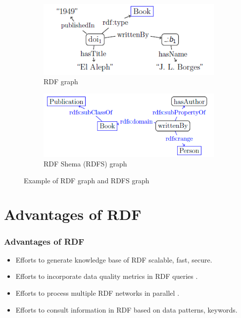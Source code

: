 \documentclass{beamer}
\numberwithin{figure}{section}
\numberwithin{equation}{section}
\begin{document}
\begin{frame}
 	\begin{figure}[h]
        \begin{subfigure}[h]{0.45\linewidth} 
            \includegraphics[width=\linewidth]{pictures/rdf_graph}
            \caption{\tiny RDF graph}
            \label{fig:rdf_graph}
        \end{subfigure}       
        \begin{subfigure}[h]{0.45\linewidth} 
            \includegraphics[width=\linewidth]{pictures/rdfs_graph}
            \caption{\tiny RDF Shema (RDFS) graph}
            \label{fig:rdfs_graph}
        \end{subfigure}
        \caption{\scriptsize Example of RDF graph and RDFS graph}
    \end{figure}

  
\end{frame}

\section{Advantages of RDF}
\begin{frame}
 \frametitle{Advantages of RDF}
 \begin{itemize}
	\scriptsize
  	\item Efforts to generate knowledge base of RDF scalable, fast, secure\cite{Ren2018}.
    \vspace{2.5mm}
  	\item Efforts to incorporate data quality metrics in RDF queries \cite{Zneika2016}\cite{Cheng2012}\cite{Bursztyn2014}.
    \vspace{2.5mm}
  	\item  Efforts to process multiple RDF networks in parallel \cite{Doel2017}\cite{Kushwaha2015}.
    \vspace{2.5mm}
    \item  Efforts to consult information in RDF based on data patterns, keywords\cite{Kushwaha2015}.
 \end{itemize}
 
\end{frame}
\end{document}
